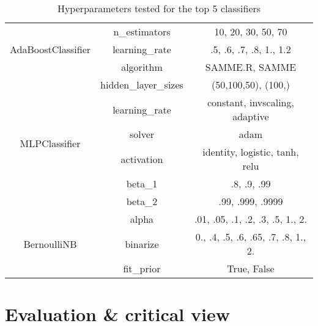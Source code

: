 \documentclass[12pt]{article}
\begin{document}
\begin{table}[ht]
\begin{tabular}{ccc}
        \multirow{3}{*}{AdaBoostClassifier}         & n\_estimators           & 10, 20, 30, 50, 70                  \\
                                                    & learning\_rate          & .5, .6, .7, .8, 1., 1.2             \\
                                                    & algorithm               & SAMME.R, SAMME                      \\
        \midrule
        \multirow{6}{*}{MLPClassifier}              & hidden\_layer\_sizes    & (50,100,50), (100,)                 \\
                                                    & learning\_rate          & constant, invscaling, adaptive      \\
                                                    & solver                  & adam                                \\
                                                    & activation              & identity, logistic, tanh, relu      \\
                                                    & beta\_1                 & .8, .9, .99                         \\
                                                    & beta\_2                 & .99, .999, .9999                    \\
        \midrule
        \multirow{3}{*}{BernoulliNB}                & alpha                   & .01, .05, .1, .2, .3, .5, 1., 2.    \\
                                                    & binarize                & 0., .4, .5, .6, .65, .7, .8, 1., 2. \\
                                                    & fit\_prior              & True, False                         \\
        \bottomrule
    \end{tabular}
    \caption{Hyperparameters tested for the top 5 classifiers}
    \label{table: hyperparameters tested}
\end{table}

\section{Evaluation \& critical view}

\clearpage

\printnoidxglossaries
\end{document}
